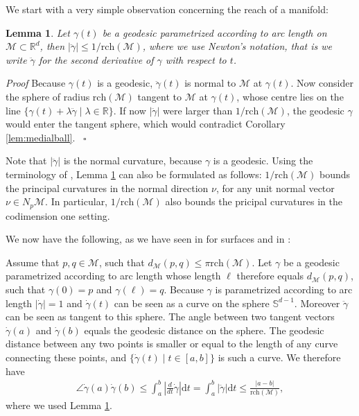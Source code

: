 \documentclass{article}
\newenvironment{proof}[1][{}]{%
  \begin{trivlist}\item[]\textit{Proof #1}\quad}%
  {\hfill\hspace*{\fill}~$\square$\end{trivlist}}
\newtheorem{lemma}[theorem]{Lemma}
\newcommand{\ud}{\mathrm{d}}
\newcommand{\M}{\mathcal{M}}
\newcommand{\rch}{\mathrm{rch}}
\begin{document}
We start with a very simple observation concerning the reach of a manifold:
\begin{lemma}
\label{lem:ReachSecondDer}
Let $\gamma(t)$ be a geodesic parametrized according to arc length on $\M \subset \mathbb{R}^d$, then $|\ddot{\gamma} | \leq 1/ \rch (\M)$, where we use Newton's notation, that is we write $\ddot{\gamma}$ for the second derivative of $\gamma$ with respect to $t$. 
\end{lemma}
\begin{proof} 
Because $\gamma(t)$ is a geodesic, $\ddot{\gamma}(t)$ is normal to $\M$ at $\gamma(t)$. Now consider the sphere of radius $\rch(\M)$ tangent to $\M$ at $\gamma(t)$, whose centre lies on the line $\{ \gamma(t)+ \lambda \ddot{\gamma}  \mid \lambda \in \mathbb{R} \}$. If now $|\ddot{\gamma} | $ were larger than $1/ \rch (\M)$, the geodesic $\gamma$ would enter the tangent sphere, which would contradict Corollary \ref{lem:medialball}.
\end{proof}

Note that $|\ddot{\gamma} | $ is the normal curvature, because $\gamma$ is a geodesic. Using the terminology of \cite[Section 6]{niyogi2008}, Lemma \ref{lem:ReachSecondDer} can also be formulated as follows: $1/ \rch (\M)$ bounds the principal curvatures in the normal direction $\nu$, for any unit normal vector $\nu\in N_p \M$. In particular, $1/ \rch (\M)$ also bounds the pricipal curvatures in the codimension one setting. 


We now have the following, as we have seen in \cite{attali:hal-00201055} for surfaces and in \cite{TangentVar}: 

Assume that $p,q \in \M $, such that $d_\M (p,q) \leq \pi \rch(\M)$. 
Let $\gamma$ be a geodesic parametrized according to arc length whose length $\ell$ therefore equals $d_\M (p,q)$, such that $\gamma(0)=p$ and $\gamma(\ell)=q$. Because $\gamma$ is parametrized according to arc length $| \dot{\gamma} |=1$ and $\dot{\gamma}(t)$ can be seen as a curve on the sphere $\mathbb{S}^{d-1}$. Moreover $\ddot{\gamma}$ can be seen as tangent to this sphere. The angle between two tangent vectors $\dot{\gamma}(a)$ and $\dot{\gamma}(b)$ equals the geodesic distance on the sphere. The geodesic distance between any two points is smaller or equal to the length of any curve connecting these points, and $\{\dot{\gamma}(t) \mid t \in [a,b] \}$ is such a curve. We therefore have
\begin{align}
\angle \dot{\gamma}(a) \dot{\gamma}(b) 
\leq \int_{a}^{b} \left | \frac{d}{dt} \dot{\gamma} \right| \ud t 
=\int_{a}^{b} |  \ddot{\gamma} | \ud t 
\leq \frac{|a-b| } {\rch(\M)} ,
\label{eq:angleEst1}
\end{align}
where we used Lemma \ref{lem:ReachSecondDer}. 
\end{document}
